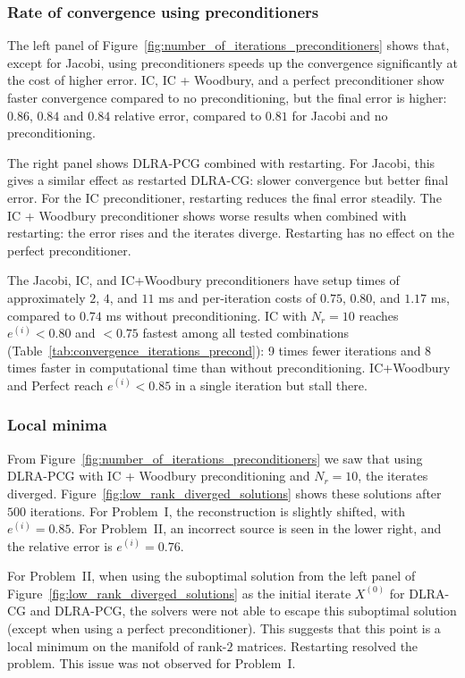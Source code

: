 \subsubsection{Rate of convergence using preconditioners}\label{sec:rate_of_convergence_using_preconditioners}


The left panel of Figure~\ref{fig:number_of_iterations_preconditioners} shows that, except for Jacobi, using preconditioners speeds up the convergence significantly at the cost of higher error. IC, IC + Woodbury, and a perfect preconditioner show faster convergence compared to no preconditioning, but the final error is higher: $0.86$, $0.84$ and $0.84$ relative error, compared to $0.81$ for Jacobi and no preconditioning.

The right panel shows DLRA-PCG combined with restarting. For Jacobi, this gives a similar effect as restarted DLRA-CG: slower convergence but better final error. For the IC preconditioner, restarting reduces the final error steadily. The IC + Woodbury preconditioner shows worse results when combined with restarting: the error rises and the iterates diverge. Restarting has no effect on the perfect preconditioner.

The Jacobi, IC, and IC+Woodbury preconditioners have setup times of approximately $2$, $4$, and $11$ ms and per-iteration costs of $0.75$, $0.80$, and $1.17$ ms, compared to $0.74$ ms without preconditioning. IC with $N_r = 10$ reaches $e^{(i)} < 0.80$ and $< 0.75$ fastest among all tested combinations (Table~\ref{tab:convergence_iterations_precond}): 9 times fewer iterations and 8 times faster in computational time than without preconditioning. IC+Woodbury and Perfect reach $e^{(i)} < 0.85$ in a single iteration but stall there.


\subsubsection{Local minima}\label{sec:local_minima}

From Figure~\ref{fig:number_of_iterations_preconditioners} we saw that using DLRA-PCG with IC + Woodbury preconditioning and $N_r = 10$, the iterates diverged. Figure~\ref{fig:low_rank_diverged_solutions} shows these solutions after $500$ iterations. For Problem~I, the reconstruction is slightly shifted, with $e^{(i)} = 0.85$. For Problem~II, an incorrect source is seen in the lower right, and the relative error is $e^{(i)} = 0.76$.

For Problem~II, when using the suboptimal solution from the left panel of Figure~\ref{fig:low_rank_diverged_solutions} as the initial iterate $X^{(0)}$ for DLRA-CG and DLRA-PCG, the solvers were not able to escape this suboptimal solution (except when using a perfect preconditioner). This suggests that this point is a local minimum on the manifold of rank-$2$ matrices. Restarting resolved the problem. This issue was not observed for Problem~I. 

